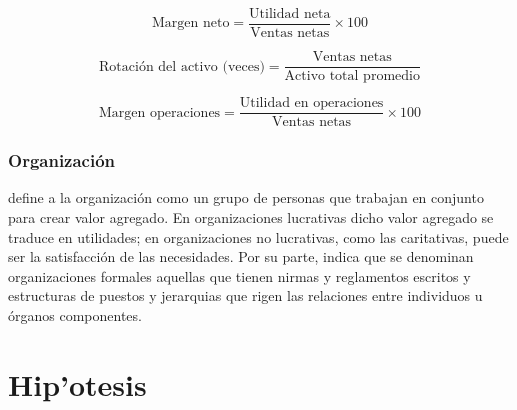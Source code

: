 \begin{equation}\label{eq:margen_neto}
    \text{Margen neto}=\frac{\text{Utilidad neta}}{\text{Ventas netas}}\times{100}
\end{equation}

\begin{equation}\label{eq:rotacion_activo}
    \text{Rotaci\'on del activo (veces)}=\frac{\text{Ventas netas}}{\text{Activo total promedio}}
\end{equation}

\begin{equation}\label{eq:margen_operaciones}
    \text{Margen operaciones} = \frac{\text{Utilidad en operaciones}}{\text{Ventas netas}}\times{100}
\end{equation}

\subsubsection{Organizaci\'on}
\cite{koontz} define a la organizaci\'on como un grupo de personas que trabajan en
conjunto para crear valor agregado. En organizaciones lucrativas dicho valor agregado
se traduce en utilidades; en organizaciones no lucrativas, como las caritativas,
puede ser la satisfacci\'on de las necesidades. Por su parte, \citep{chiavenato}
indica que se denominan organizaciones formales aquellas que tienen nirmas y reglamentos
escritos y estructuras de puestos y jerarquias que rigen las relaciones entre
individuos u \'organos componentes.

\section{Hip'otesis}

